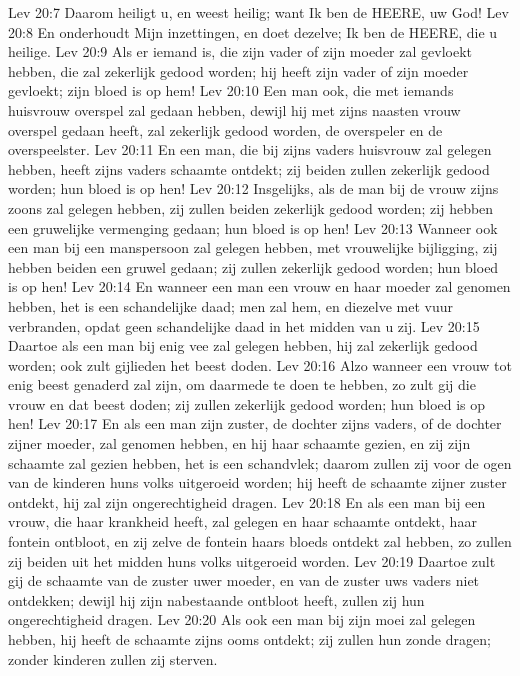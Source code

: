 Lev 20:7  Daarom heiligt u, en weest heilig; want Ik ben de HEERE, uw God!
Lev 20:8  En onderhoudt Mijn inzettingen, en doet dezelve; Ik ben de HEERE, die u heilige.
Lev 20:9  Als er iemand is, die zijn vader of zijn moeder zal gevloekt hebben, die zal zekerlijk gedood worden; hij heeft zijn vader of zijn moeder gevloekt; zijn bloed is op hem!
Lev 20:10  Een man ook, die met iemands huisvrouw overspel zal gedaan hebben, dewijl hij met zijns naasten vrouw overspel gedaan heeft, zal zekerlijk gedood worden, de overspeler en de overspeelster.
Lev 20:11  En een man, die bij zijns vaders huisvrouw zal gelegen hebben, heeft zijns vaders schaamte ontdekt; zij beiden zullen zekerlijk gedood worden; hun bloed is op hen!
Lev 20:12  Insgelijks, als de man bij de vrouw zijns zoons zal gelegen hebben, zij zullen beiden zekerlijk gedood worden; zij hebben een gruwelijke vermenging gedaan; hun bloed is op hen!
Lev 20:13  Wanneer ook een man bij een manspersoon zal gelegen hebben, met vrouwelijke bijligging, zij hebben beiden een gruwel gedaan; zij zullen zekerlijk gedood worden; hun bloed is op hen!
Lev 20:14  En wanneer een man een vrouw en haar moeder zal genomen hebben, het is een schandelijke daad; men zal hem, en diezelve met vuur verbranden, opdat geen schandelijke daad in het midden van u zij.
Lev 20:15  Daartoe als een man bij enig vee zal gelegen hebben, hij zal zekerlijk gedood worden; ook zult gijlieden het beest doden.
Lev 20:16  Alzo wanneer een vrouw tot enig beest genaderd zal zijn, om daarmede te doen te hebben, zo zult gij die vrouw en dat beest doden; zij zullen zekerlijk gedood worden; hun bloed is op hen!
Lev 20:17  En als een man zijn zuster, de dochter zijns vaders, of de dochter zijner moeder, zal genomen hebben, en hij haar schaamte gezien, en zij zijn schaamte zal gezien hebben, het is een schandvlek; daarom zullen zij voor de ogen van de kinderen huns volks uitgeroeid worden; hij heeft de schaamte zijner zuster ontdekt, hij zal zijn ongerechtigheid dragen.
Lev 20:18  En als een man bij een vrouw, die haar krankheid heeft, zal gelegen en haar schaamte ontdekt, haar fontein ontbloot, en zij zelve de fontein haars bloeds ontdekt zal hebben, zo zullen zij beiden uit het midden huns volks uitgeroeid worden.
Lev 20:19  Daartoe zult gij de schaamte van de zuster uwer moeder, en van de zuster uws vaders niet ontdekken; dewijl hij zijn nabestaande ontbloot heeft, zullen zij hun ongerechtigheid dragen.
Lev 20:20  Als ook een man bij zijn moei zal gelegen hebben, hij heeft de schaamte zijns ooms ontdekt; zij zullen hun zonde dragen; zonder kinderen zullen zij sterven.
